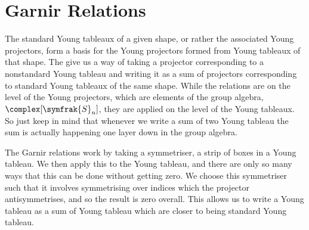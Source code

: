 \documentclass[fleqn]{NotesClass}
\newcommand{\symmetricGroup}[1][n]{\symfrak{S}_{#1}}
\begin{document}
    \section{Garnir Relations}
    The standard Young tableaux of a given shape, or rather the associated Young projectors, form a basis for the Young projectors formed from Young tableaux of that shape.
    The  give us a way of taking a projector corresponding to a nonstandard Young tableau and writing it as a sum of projectors corresponding to standard Young tableaux of the same shape.
    While the relations are on the level of the Young projectors, which are elements of the group algebra, \(\complex[\symmetricGroup]\), they are applied on the level of the Young tableaux.
    So just keep in mind that whenever we write a sum of two Young tableau the sum is actually happening one layer down in the group algebra.
    
    The Garnir relations work by taking a symmetriser, a strip of boxes in a Young tableau.
    We then apply this to the Young tableau, and there are only so many ways that this can be done without getting zero.
    We choose this symmetriser such that it involves symmetrising over indices which the projector antisymmetrises, and so the result is zero overall.
    This allows us to write a Young tableau as a sum of Young tableau which are closer to being standard Young tableau.
    
\end{document}
